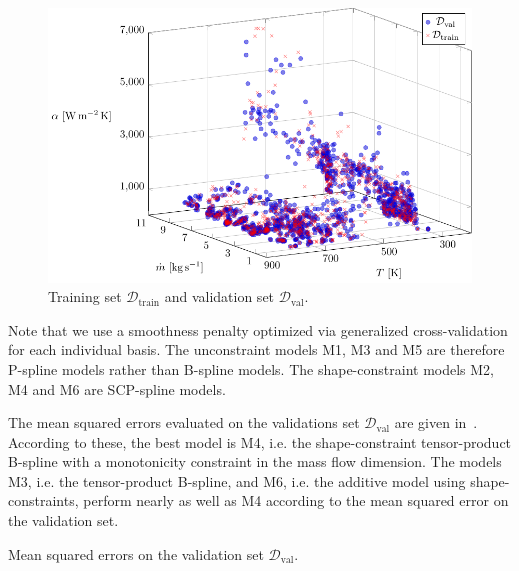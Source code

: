 \begin{figure}[H]
	\centering
	\includegraphics[width=\columnwidth]{graphics/pgfplots/cha5/Ebner/train-val-split.pdf}
	\caption{Training set $\mathcal{D}_{\text{train}}$ and validation set $\mathcal{D}_{\text{val}}$.}
	\label{fig:ebner-train-val-split}
\end{figure}
%
Note that we use a smoothness penalty optimized via generalized cross-validation for each individual basis. The unconstraint models M1, M3 and M5 are therefore P-spline models rather than B-spline models. The shape-constraint models M2, M4 and M6 are SCP-spline models. 

The mean squared errors evaluated on the validations set $\mathcal{D}_{\text{val}}$ are given in~. According to these, the best model is M4, i.e. the shape-constraint tensor-product B-spline with a monotonicity constraint in the mass flow dimension. The models M3, i.e. the tensor-product B-spline, and M6, i.e. the additive model using shape-constraints, perform nearly as well as M4 according to the mean squared error on the validation set. 

\begin{table}[H]
	\begin{center}
	\end{center}
	\caption{Mean squared errors on the validation set $\mathcal{D}_{\text{val}}$.}
	\label{tab:ebner-mse-val}
\end{table}

